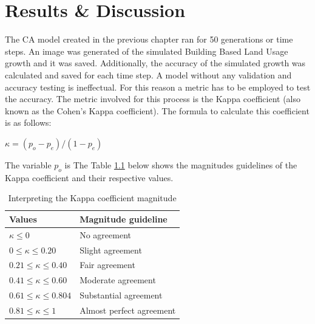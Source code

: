 \chapter{Results \& Discussion} %
The CA model created in the previous chapter ran for 50 generations or time steps. An image was generated of the simulated Building Based Land Usage growth and it was saved. Additionally, the accuracy of the simulated growth was calculated and saved for each time step. A model without any validation and accuracy testing is ineffectual. For this reason a metric has to be employed to test the accuracy. The metric involved for this process is the Kappa coefficient (also known as the Cohen's Kappa coefficient). The formula to calculate this coefficient is as follows:
\begin{center}
$\kappa = (p_o - p_e) / (1 - p_e)$
\end{center}
The variable $p_o$ is 
The Table \ref{table:kap} below shows the magnitudes guidelines of the Kappa coefficient and their respective values.\cite{kappatb}
\begin{table}[H]
\centering
\caption{Interpreting the Kappa coefficient magnitude}
\label{table:kap}
\begin{tabular}{@{}ll@{}}
\toprule
\multicolumn{1}{l}{Values} & \multicolumn{1}{l}{Magnitude guideline} \\ \midrule
$\kappa \leq 0$                & No agreement                            \\
$0 \leq \kappa \leq 0.20$                     & Slight agreement                        \\
$0.21 \leq \kappa \leq 0.40$                  & Fair agreement                          \\
$0.41 \leq \kappa \leq 0.60$                  & Moderate agreement                      \\
$0.61 \leq \kappa \leq 0.804$                  & Substantial agreement                   \\
$0.81 \leq \kappa \leq 1$                     & Almost perfect agreement                \\ \bottomrule
\end{tabular}
\end{table}
\label{Chapter4} %
